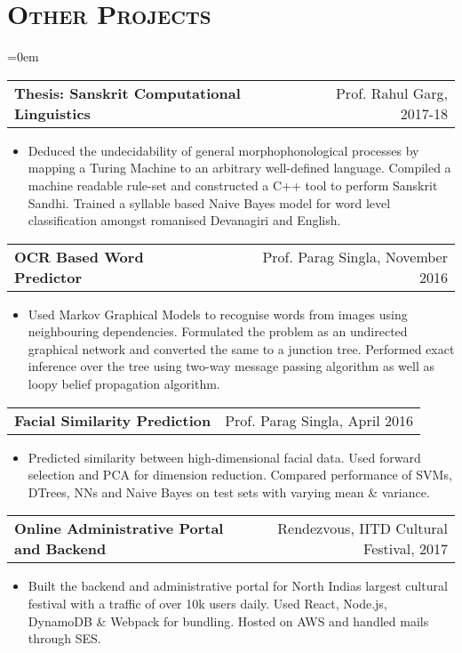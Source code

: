 \documentclass{article}
\makeatletter
\newenvironment{longversion}{}{} %
\newcommand{\headerrow}[2]
{\begin{tabular*}{\linewidth}{l@{\extracolsep{\fill}}r}
	#1 &
	#2 \\
\end{tabular*}}
\newcommand{\tmpsection}[1]{}
\let\tmpsection=\section
\renewcommand{\section}[1]{\tmpsection*{\textsc{#1}}}
\makeatother
\begin{document}
\begin{longversion}
\section{Other Projects}
\begin{list} {}{\leftmargin=0em}
\setlength{\leftmargin}{0pt}

\item[]
  \headerrow{ \textbf{Thesis: Sanskrit Computational Linguistics}} {Prof. Rahul Garg, 2017-18}
  \begin{itemize} \item[]
  Deduced the undecidability of general morphophonological processes by mapping a Turing Machine to an arbitrary well-defined language. Compiled a machine readable rule-set and constructed a C++ tool to perform Sanskrit Sandhi. Trained a syllable based Naive Bayes model for word level classification amongst romanised Devanagiri and English.
  \end{itemize}
 

\item[]
  \headerrow{ \textbf{OCR Based Word Predictor}} {Prof. Parag Singla, November 2016}
  \begin{itemize} \item[]
  Used Markov Graphical Models to recognise words from images using neighbouring dependencies. Formulated the problem as an undirected graphical network and converted the same to a junction tree. Performed exact inference over the tree using two-way message passing algorithm as well as loopy belief propagation algorithm. 
  \end{itemize}

\item[]
  \headerrow{ \textbf{Facial Similarity Prediction}} {Prof. Parag Singla, April 2016}
  \begin{itemize} \item[]
  Predicted similarity between high-dimensional facial data. Used forward selection and PCA for dimension reduction. Compared performance of SVMs, DTrees, NNs and Naive Bayes on test sets with varying mean \& variance.
  \end{itemize}
  
  \item[]
  \headerrow{ \textbf{Online Administrative Portal and Backend}} {Rendezvous, IITD Cultural Festival, 2017}
  \begin{itemize} \item[]
  Built the backend and administrative portal for North India\textsc{}s largest cultural festival with a traffic of over 10k users daily. Used React, Node.js, DynamoDB \& Webpack for bundling. Hosted on AWS and handled mails through SES.
  \end{itemize}


\end{list}
\end{longversion}
\end{document}
